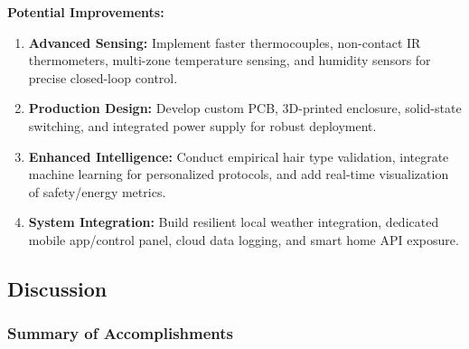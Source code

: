 \documentclass[11pt,a4paper]{article}
\begin{document}
\vspace{1\baselineskip}

\noindent\textbf{Potential Improvements:}
\begin{enumerate}[leftmargin=*,label={\arabic*.}]
  \item \textbf{Advanced Sensing:} Implement faster thermocouples, non-contact IR thermometers, multi-zone temperature sensing, and humidity sensors for precise closed-loop control.

  \item \textbf{Production Design:} Develop custom PCB, 3D-printed enclosure, solid-state switching, and integrated power supply for robust deployment.

  \item \textbf{Enhanced Intelligence:} Conduct empirical hair type validation, integrate machine learning for personalized protocols, and add real-time visualization of safety/energy metrics.

  \item \textbf{System Integration:} Build resilient local weather integration, dedicated mobile app/control panel, cloud data logging, and smart home API exposure.
\end{enumerate}

\newpage

\subsection{Discussion}

\subsubsection*{Summary of Accomplishments}
\end{document}
